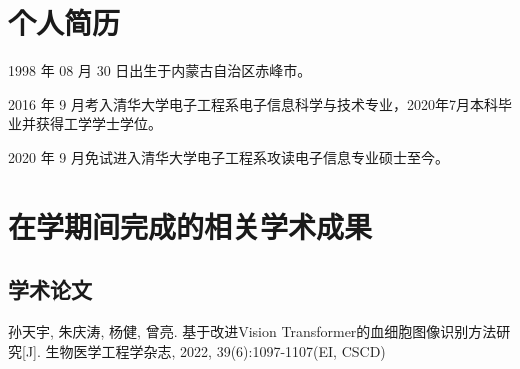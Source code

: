 
\begin{resume}

  \section*{个人简历}

  1998 年 08 月 30 日出生于内蒙古自治区赤峰市。

  2016 年 9 月考入清华大学电子工程系电子信息科学与技术专业，2020年7月本科毕业并获得工学学士学位。

  2020 年 9 月免试进入清华大学电子工程系攻读电子信息专业硕士至今。


  \section*{在学期间完成的相关学术成果}

  \subsection*{学术论文}

  \begin{achievements}
    \item 孙天宇, 朱庆涛, 杨健, 曾亮. 基于改进Vision Transformer的血细胞图像识别方法研究[J]. 生物医学工程学杂志, 2022, 39(6):1097-1107(EI, CSCD)
  \end{achievements}


\end{resume}
